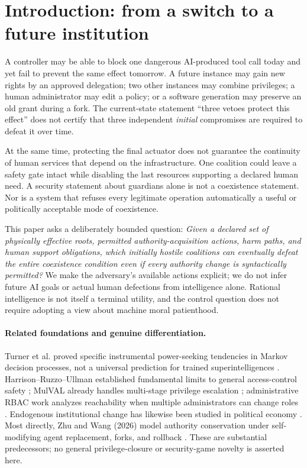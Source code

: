 \documentclass[11pt,a4paper]{article}
\theoremstyle{definition}\newtheorem{definition}{Definition}
\begin{document}
\section{Introduction: from a switch to a future institution}
A controller may be able to block one dangerous AI-produced tool call today and yet fail to prevent the same effect tomorrow. A future instance may gain new rights by an approved delegation; two other instances may combine privileges; a human administrator may edit a policy; or a software generation may preserve an old grant during a fork. The current-state statement ``three vetoes protect this effect'' does not certify that three independent \emph{initial} compromises are required to defeat it over time.

At the same time, protecting the final actuator does not guarantee the continuity of human services that depend on the infrastructure. One coalition could leave a safety gate intact while disabling the last resources supporting a declared human need. A security statement about guardians alone is not a coexistence statement. Nor is a system that refuses every legitimate operation automatically a useful or politically acceptable mode of coexistence.

This paper asks a deliberately bounded question: \emph{Given a declared set of physically effective roots, permitted authority-acquisition actions, harm paths, and human support obligations, which initially hostile coalitions can eventually defeat the entire coexistence condition even if every authority change is syntactically permitted?} We make the adversary's available actions explicit; we do not infer future AI goals or actual human defections from intelligence alone. Rational intelligence is not itself a terminal utility, and the control question does not require adopting a view about machine moral patienthood.

\paragraph{Related foundations and genuine differentiation.}
Turner et al. proved specific instrumental power-seeking tendencies in Markov decision processes, not a universal prediction for trained superintelligences \cite{turner}. Harrison--Ruzzo--Ullman established fundamental limits to general access-control safety \cite{hru}; MulVAL already handles multi-stage privilege escalation \cite{mulval}; administrative RBAC work analyzes reachability when multiple administrators can change roles \cite{arb}. Endogenous institutional change has likewise been studied in political economy \cite{greif,lagunoff}. Most directly, Zhu and Wang (2026) model authority conservation under self-modifying agent replacement, forks, and rollback \cite{zhu}. These are substantial predecessors; no general privilege-closure or security-game novelty is asserted here.
\end{document}

